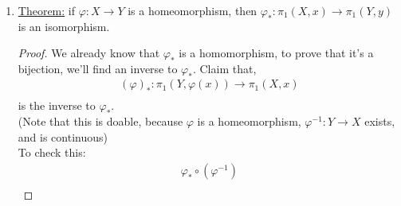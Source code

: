 \begin{enumerate}
\begin{proof}
\begin{enumerate}
\begin{align}
                            \pi_1(X,x)\rightarrow\pi_1(Z,(\psi\circ\varphi)(x))\\
                        \end{align}
                        Given any $[f]\in\pi_1(X,x)$:
                        \begin{align*}
                            (\psi\circ\varphi)_{*}([f])=[(\psi\circ\varphi)\circ f]\\
                            =[\psi\circ(\varphi\circ f)]\\
                            =\psi_{*}[\varphi\circ f]\\
                            =\psi_{*}(\varphi_{*}(f))\\
                            =(\psi_{*}\circ\varphi_{*})([f])\\
                        \end{align*}
                    \item Given any $[f]\in\pi_1(X,x)$:
                        \begin{align*}
                            id_{*}([f])=[id\circ f]\\
                            =[f]\\
                        \end{align*}
                \end{enumerate}
        \end{proof}
        \item \underline{Theorem:} if $\varphi: X\rightarrow Y$ is a homeomorphism,
            then $\varphi_{*}: \pi_{1}(X,x)\rightarrow\pi_{1}(Y,y)$ is an isomorphism.
                \begin{proof}
                    We already know that $\varphi_{*}$ is a homomorphism, to prove that it's
                    a bijection, we'll find an inverse to $\varphi_{*}$. Claim that,
                    \begin{align*}
                        (\varphi)_{*}:\pi_1(Y,\varphi(x))\rightarrow\pi_1(X,x)\\
                    \end{align*}
                    is the inverse to $\varphi_{*}$.\\
                    (Note that this is doable, because $\varphi$ is a homeomorphism, $\varphi^{-1}:Y\rightarrow X$ exists, and is continuous)\\
                    To check this:
                    \begin{align*}
                        \varphi_{*}\circ (\varphi^{-1})\\

\end{align*}
\end{proof}
\end{enumerate}
